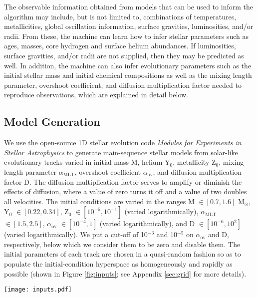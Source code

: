 \documentclass[manuscript,linenumbers]{aastex6}
\newif\ifref
\newcommand{\mb}[1]{\ifref\boldmath\textbf{#1}\unboldmath\else #1\fi}
\begin{document}
The \mb{observable information obtained from models that can be} used to inform the algorithm may include, but \mb{is} not limited to, combinations of temperatures, metallicities, global oscillation information, surface gravities, luminosities, and/or radii. From these, the machine can learn how to infer stellar parameters such as ages, masses, core hydrogen and surface helium abundances. If luminosities, surface gravities, and/or radii are not supplied, then they may be predicted as well. In addition, the machine can also infer evolutionary parameters such as the initial stellar mass and initial chemical compositions as well as the mixing length parameter, overshoot coefficient, and diffusion multiplication factor needed to reproduce observations, which are explained in detail below. 

\subsection{Model Generation}
\label{sec:models}
We use the open-source 1D stellar evolution code \emph{Modules for Experiments in Stellar Astrophysics} \citep[MESA;][]{Paxton2011} to generate main-sequence stellar models from solar-like evolutionary tracks varied in initial mass M, helium Y$_0$, metallicity Z$_0$, mixing length parameter $\alpha_{\text{MLT}}$, overshoot coefficient $\alpha_{\text{ov}}$, and \mb{diffusion multiplication factor} D. \mb{The diffusion multiplication factor} serves to amplify or diminish the effects of diffusion, where a value of zero turn\mb{s} it off and a value of two double\mb{s} all velocities. The initial conditions are varied in the ranges M $\in [0.7, 1.6]$ M$_\odot$, Y$_0$ $\in [0.22, 0.34]$, Z$_0$ $\in [10^{-5}, 10^{-1}]$ (varied logarithmically), $\alpha_{\text{MLT}}$ $\in [1.5, 2.5]$, $\alpha_{\text{ov}}$ $\in [10^{-4}, 1]$ (varied logarithmically), and D $\in [10^{-6}, 10^2]$ (varied logarithmically). We put a cut-off of 10$^{-3}$ and 10$^{-5}$ on $\alpha_{\text{ov}}$ and D, respectively, below which we consider them to be zero and \mb{disable them}. The initial parameters of each track are chosen in a quasi-random fashion so as to populate the initial-condition hyperspace as homogeneously and rapidly as possible (shown in Figure \ref{fig:inputs}; see Appendix \ref{sec:grid} for more details). 

\begin{figure*}
    \centering
    \texttt{[image: inputs.pdf]}
    \caption{Scatterplot matrix (lower panels) and density plots (diagonal) of evolutionary track initial conditions considered. Mass (M), initial helium (Y$_0$), initial metallicity (Z$_0$), mixing length parameter ($\alpha_{\text{MLT}}$), overshoot ($\alpha_{\text{ov}}$), and diffusion multiplication factor (D) were varied in a quasi-random fashion to obtain a low-discrepancy grid of model tracks. Points are colored by their initial hydrogen X$_0=1-$Y$_0-$Z$_0$, with blue being \mb{high} X$_0$ ($\approx 56\%$) and black being \mb{low} X$_0$ ($\approx 78\%$). The parameter space is densely populated with evolutionary tracks of maximally different initial conditions. }
    \label{fig:inputs}
\end{figure*}
\end{document}
